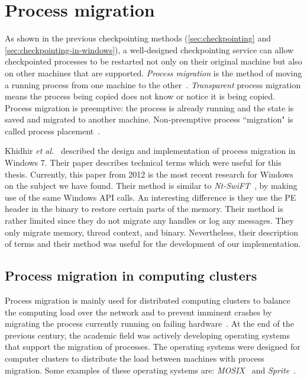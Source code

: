 \documentclass[a4paper, 11pt, english]{report}
\begin{document}
\section{Process migration}
\label{sec:process-migration}
As shown in the previous checkpointing methods (\autoref{sec:checkpointing} and \autoref{sec:checkpointing-in-windows}), a well-designed checkpointing service can allow checkpointed processes to be restarted not only on their original machine but also on other machines that are supported.
\textit{Process migration} is the method of moving a running process from one machine to the other~\cite{process-migration}. \textit{Transparent} process migration means the process being copied does not know or notice it is being copied.
Process migration is preemptive: the process is already running and the state is saved and migrated to another machine. Non-preemptive process ``migration" is called process placement~\cite{krueger1988load}.

Khidhir \textit{et al.}~\cite{khidhir2012migrationwin7} described the design and implementation of process migration in Windows 7. Their paper describes technical terms which were useful for this thesis. Currently, this paper from 2012 is the most recent research for Windows on the subject we have found. Their method is similar to \textit{Nt-SwiFT}~\cite{huang1998nt-swift}, by making use of the same Windows API calls. An interesting difference is they use the PE header in the binary to restore certain parts of the memory. Their method is rather limited since they do not migrate any handles or log any messages. They only migrate memory, thread context, and binary. Nevertheless, their description of terms and their method was useful for the development of our implementation.

\subsection{Process migration in computing clusters}
Process migration is mainly used for distributed computing clusters to balance the computing load over the network and to prevent imminent crashes by migrating the process currently running on failing hardware~\cite{process-migration}.
At the end of the previous century, the academic field was actively developing operating systems that support the migration of processes. The operating systems were designed for computer clusters to distribute the load between machines with process migration. Some examples of these operating systems are: \textit{MOSIX}~\cite{barak1998mosix} and \textit{Sprite}~\cite{ousterhout1988sprite}.
\end{document}
